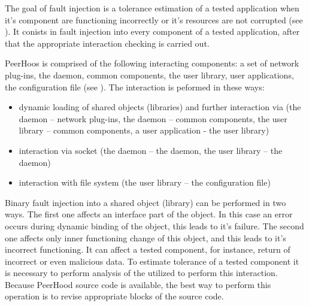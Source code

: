 

%
The goal of fault injection is a tolerance estimation of a tested application when it's component are functioning incorrectly or it's resources are not corrupted (see ). 
%
It conists in fault injection into every component of a tested application, after that the appropriate interaction checking is carried out. 

%
PeerHoos is comprised of the following interacting components: a set of network plug-ins, the daemon, common components, the user library, user applications, the configuration file (see ). 
%
The interaction is peformed in these ways: 
\begin{itemize}
	\setlength{\itemsep}{0pt}%

	\item dynamic loading of shared objects (libraries) and further interaction via  (the daemon -- network plug-ins, the daemon -- common components, the user library -- common components, a user application - the user library)
	\item interaction via socket (the daemon -- the daemon, the user library -- the daemon)
	\item interaction with file system (the user library -- the configuration file)
\end{itemize}

%
Binary fault injection into a shared object (library) can be performed in two ways. 
%
The first one affects an interface part of the object. 
%
In this case an error occurs during dynamic binding of the object, this leads to it's failure. 
%
The second one affects only inner functioning change of this object, and this leads to it's incorrect functioning. 
%
It can affect a tested component, for instance, return of incorrect or even malicious data. 
%
To estimate tolerance of a tested component it is necessary to perform analysis of the  utilized to perform this interaction. 
%
Because PeerHood source code is available, the best way to perform this operation is to revise appropriate blocks of the source code. 

